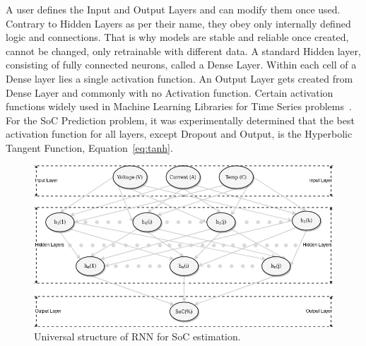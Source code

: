 %
%
A user defines the Input and Output Layers and can modify them once used.
Contrary to Hidden Layers as per their name, they obey only internally defined logic and connections.
That is why models are stable and reliable once created, cannot be changed, only retrainable with different data.
A standard Hidden layer, consisting of fully connected neurons, called a Dense Layer.
Within each cell of a Dense layer lies a single activation function.
An Output Layer gets created from Dense Layer and commonly with no Activation function.
Certain activation functions widely used in Machine Learning Libraries for Time Series problems~\cite{Chemali2017}.
For the SoC Prediction problem, it was experimentally determined that the best activation function for all layers, except Dropout and Output, is the Hyperbolic Tangent Function, Equation~\ref{eq:tanh}.
%
%
\begin{figure}[htbp]
    \centering
    \includegraphics[width=\linewidth]{II_Body/images/SoC-RNN.png}
    \caption{Universal structure of RNN for SoC estimation.}
    \label{fig:RNN-structure}
\end{figure}
